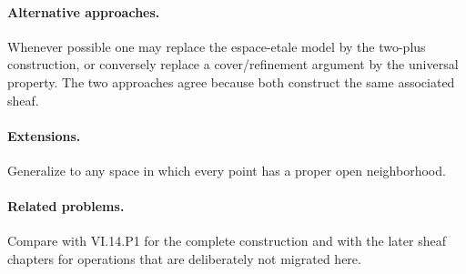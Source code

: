 \paragraph{Alternative approaches.}
Whenever possible one may replace the espace-etale model by the two-plus construction, or conversely replace a cover/refinement argument by the universal property.  The two approaches agree because both construct the same associated sheaf.

\paragraph{Extensions.}
Generalize to any space in which every point has a proper open neighborhood.

\paragraph{Related problems.}
Compare with VI.14.P1 for the complete construction and with the later sheaf chapters for operations that are deliberately not migrated here.
\fi
